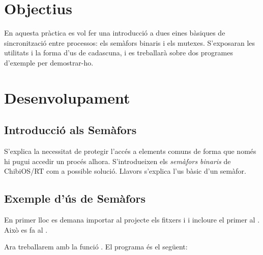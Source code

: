 
\section{Objectius}

En aquesta pràctica es vol fer una introducció a dues eines bàsiques
de sincronització entre processos: els semàfors binaris i els mutexes.
S'exposaran les utilitats i la forma d'us de cadascuna, i es treballarà
sobre dos programes d'exemple per demostrar-ho.

\section{Desenvolupament}


\subsection{Introducció als Semàfors}

S'explica la necessitat de protegir l'accés a elements comuns de forma que
només hi pugui accedir un procés alhora. S'introdueixen els \emph{semàfors binaris}
de ChibiOS/RT com a possible solució. Llavors s'explica l'us bàsic d'un semàfor.


\subsection{Exemple d'ús de Semàfors}

En primer lloc es demana importar al projecte els fitxers  i 
i incloure el primer al . Això es fa al .

Ara treballarem amb la funció . El programa és el següent:

